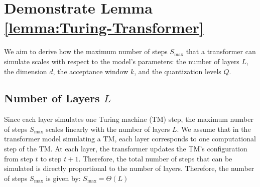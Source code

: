 \section{Demonstrate Lemma \ref{lemma:Turing-Transformer}}

We aim to derive how the maximum number of steps \( S_{\text{max}} \) that a transformer can simulate scales with respect to the model's parameters: the number of layers \( L \), the dimension \( d \), the acceptance window \( k \), and the quantization levels \( Q \).

\subsection{Number of Layers \( L \)}

Since each layer simulates one Turing machine (TM) step, the maximum number of steps \( S_{\text{max}} \) scales linearly with the number of layers \( L \). We assume that in the transformer model simulating a TM, each layer corresponds to one computational step of the TM. At each layer, the transformer updates the TM's configuration from step \( t \) to step \( t+1 \). Therefore, the total number of steps that can be simulated is directly proportional to the number of layers. Therefore, the number of steps \( S_{\text{max}} \) is given by: \(
S_{\text{max}} = \Theta(L)
\)

